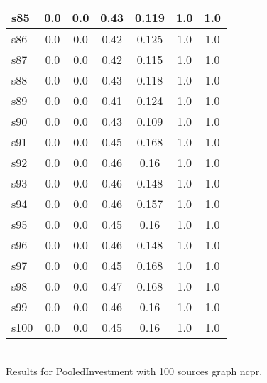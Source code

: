 \documentclass{article}
\begin{document}
\begin{tabular}{|l|c|c|c|c|c|c|}
\hline
s85 &0.0 & 0.0 & 0.43 & 0.119 & 1.0 & 1.0\\
\hline
s86 &0.0 & 0.0 & 0.42 & 0.125 & 1.0 & 1.0\\
\hline
s87 &0.0 & 0.0 & 0.42 & 0.115 & 1.0 & 1.0\\
\hline
s88 &0.0 & 0.0 & 0.43 & 0.118 & 1.0 & 1.0\\
\hline
s89 &0.0 & 0.0 & 0.41 & 0.124 & 1.0 & 1.0\\
\hline
s90 &0.0 & 0.0 & 0.43 & 0.109 & 1.0 & 1.0\\
\hline
s91 &0.0 & 0.0 & 0.45 & 0.168 & 1.0 & 1.0\\
\hline
s92 &0.0 & 0.0 & 0.46 & 0.16 & 1.0 & 1.0\\
\hline
s93 &0.0 & 0.0 & 0.46 & 0.148 & 1.0 & 1.0\\
\hline
s94 &0.0 & 0.0 & 0.46 & 0.157 & 1.0 & 1.0\\
\hline
s95 &0.0 & 0.0 & 0.45 & 0.16 & 1.0 & 1.0\\
\hline
s96 &0.0 & 0.0 & 0.46 & 0.148 & 1.0 & 1.0\\
\hline
s97 &0.0 & 0.0 & 0.45 & 0.168 & 1.0 & 1.0\\
\hline
s98 &0.0 & 0.0 & 0.47 & 0.168 & 1.0 & 1.0\\
\hline
s99 &0.0 & 0.0 & 0.46 & 0.16 & 1.0 & 1.0\\
\hline
s100 &0.0 & 0.0 & 0.45 & 0.16 & 1.0 & 1.0\\
\hline
\end{tabular}\\

\noindent Results for PooledInvestment with 100 sources graph ncpr.
\end{document}
